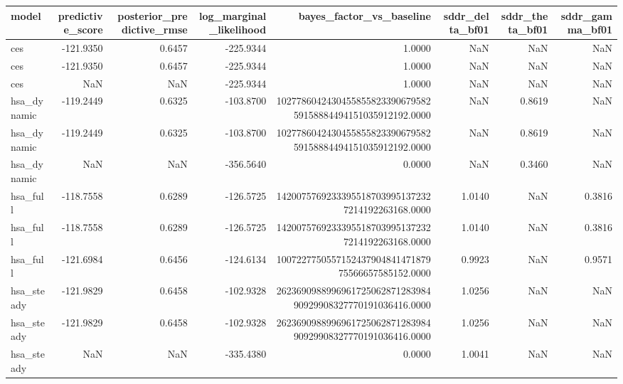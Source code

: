 \begin{tabular}{lrrrrrrr}
\toprule
model & predictive\_score & posterior\_predictive\_rmse & log\_marginal\_likelihood & bayes\_factor\_vs\_baseline & sddr\_delta\_bf01 & sddr\_theta\_bf01 & sddr\_gamma\_bf01 \\
\midrule
ces & -121.9350 & 0.6457 & -225.9344 & 1.0000 & NaN & NaN & NaN \\
ces & -121.9350 & 0.6457 & -225.9344 & 1.0000 & NaN & NaN & NaN \\
ces & NaN & NaN & -225.9344 & 1.0000 & NaN & NaN & NaN \\
hsa\_dynamic & -119.2449 & 0.6325 & -103.8700 & 102778604243045585582339067958259158884494151035912192.0000 & NaN & 0.8619 & NaN \\
hsa\_dynamic & -119.2449 & 0.6325 & -103.8700 & 102778604243045585582339067958259158884494151035912192.0000 & NaN & 0.8619 & NaN \\
hsa\_dynamic & NaN & NaN & -356.5640 & 0.0000 & NaN & 0.3460 & NaN \\
hsa\_full & -118.7558 & 0.6289 & -126.5725 & 14200757692333955187039951372327214192263168.0000 & 1.0140 & NaN & 0.3816 \\
hsa\_full & -118.7558 & 0.6289 & -126.5725 & 14200757692333955187039951372327214192263168.0000 & 1.0140 & NaN & 0.3816 \\
hsa\_full & -121.6984 & 0.6456 & -124.6134 & 100722775055715243790484147187975566657585152.0000 & 0.9923 & NaN & 0.9571 \\
hsa\_steady & -121.9829 & 0.6458 & -102.9328 & 262369098899696172506287128398490929908327770191036416.0000 & 1.0256 & NaN & NaN \\
hsa\_steady & -121.9829 & 0.6458 & -102.9328 & 262369098899696172506287128398490929908327770191036416.0000 & 1.0256 & NaN & NaN \\
hsa\_steady & NaN & NaN & -335.4380 & 0.0000 & 1.0041 & NaN & NaN \\
\bottomrule
\end{tabular}
